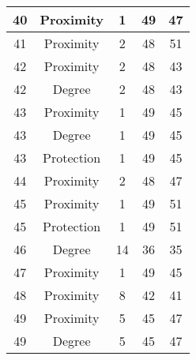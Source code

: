 \documentclass[results.tex]{subfiles}
\begin{document}
\begin{center}
\begin{tabular}{| c || c | c | c | c |}
            \hline
            40                      & Proximity                    & 1                      & 49                      & 47                   \\
            \hline
            41                      & Proximity                    & 2                      & 48                      & 51                   \\
            \hline
            42                      & Proximity                    & 2                      & 48                      & 43                   \\
            \hline
            42                      & Degree                       & 2                      & 48                      & 43                   \\
            \hline
            43                      & Proximity                    & 1                      & 49                      & 45                   \\
            \hline
            43                      & Degree                       & 1                      & 49                      & 45                   \\
            \hline
            43                      & Protection                   & 1                      & 49                      & 45                   \\
            \hline
            44                      & Proximity                    & 2                      & 48                      & 47                   \\
            \hline
            45                      & Proximity                    & 1                      & 49                      & 51                   \\
            \hline
            45                      & Protection                   & 1                      & 49                      & 51                   \\
            \hline
            46                      & Degree                       & 14                     & 36                      & 35                   \\
            \hline
            47                      & Proximity                    & 1                      & 49                      & 45                   \\
            \hline
            48                      & Proximity                    & 8                      & 42                      & 41                   \\
            \hline
            49                      & Proximity                    & 5                      & 45                      & 47                   \\
            \hline
            49                      & Degree                       & 5                      & 45                      & 47                   \\
            \hline
        \end{tabular}
    \end{center}
\end{document}

